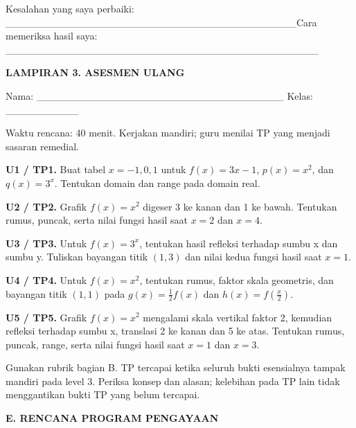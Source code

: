 \documentclass[11pt,a4paper]{article}
\begin{document}
{\small Kesalahan yang saya perbaiki: \_\_\_\_\_\_\_\_\_\_\_\_\_\_\_\_\_\_\_\_\_\_\_\_\_\_\_\_\_\_\_\_\_\_\_\_\_\_\_\_\newline Cara memeriksa hasil saya: \_\_\_\_\_\_\_\_\_\_\_\_\_\_\_\_\_\_\_\_\_\_\_\_\_\_\_\_\_\_\_\_\_\_\_\_\_\_\_\_\_\_\_\par}\medskip
\clearpage
\begin{center}\bfseries\large LAMPIRAN 3. ASESMEN ULANG\end{center}\medskip
{\small Nama: \_\_\_\_\_\_\_\_\_\_\_\_\_\_\_\_\_\_\_\_\_\_\_\_\_\_\_\_\_\_\_\_\_\_  Kelas: \_\_\_\_\_\_\_\_\_\_\par}\medskip
{\small Waktu rencana: 40 menit. Kerjakan mandiri; guru menilai TP yang menjadi sasaran remedial.\par}\medskip
\noindent\textbf{U1 / TP1.} Buat tabel \(x=-1,0,1\) untuk \(f(x)=3x-1\), \(p(x)=x^2\), dan \(q(x)=3^x\). Tentukan domain dan range pada domain real.\par\vspace{9mm}
\noindent\textbf{U2 / TP2.} Grafik \(f(x)=x^2\) digeser 3 ke kanan dan 1 ke bawah. Tentukan rumus, puncak, serta nilai fungsi hasil saat \(x=2\) dan \(x=4\).\par\vspace{9mm}
\noindent\textbf{U3 / TP3.} Untuk \(f(x)=3^x\), tentukan hasil refleksi terhadap sumbu x dan sumbu y. Tuliskan bayangan titik \((1,3)\) dan nilai kedua fungsi hasil saat \(x=1\).\par\vspace{9mm}
\noindent\textbf{U4 / TP4.} Untuk \(f(x)=x^2\), tentukan rumus, faktor skala geometris, dan bayangan titik \((1,1)\) pada \(g(x)=\frac12 f(x)\) dan \(h(x)=f\left(\frac{x}{2}\right)\).\par\vspace{9mm}
\noindent\textbf{U5 / TP5.} Grafik \(f(x)=x^2\) mengalami skala vertikal faktor 2, kemudian refleksi terhadap sumbu x, translasi 2 ke kanan dan 5 ke atas. Tentukan rumus, puncak, range, serta nilai fungsi hasil saat \(x=1\) dan \(x=3\).\par\vspace{9mm}
{\small Gunakan rubrik bagian B. TP tercapai ketika seluruh bukti esensialnya tampak mandiri pada level 3. Periksa konsep dan alasan; kelebihan pada TP lain tidak menggantikan bukti TP yang belum tercapai.\par}\medskip
\clearpage
\begin{center}\bfseries\large E. RENCANA PROGRAM PENGAYAAN\end{center}\medskip
\end{document}
